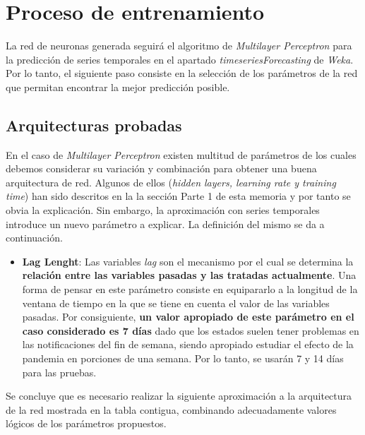 \documentclass[12pt,a4paper, xcolor=table]{article}
\begin{document}
\section{Proceso de entrenamiento}
La red de neuronas generada seguirá el algoritmo de \textit{Multilayer Perceptron }para la predicción de series temporales en el apartado \textit{timeseriesForecasting} de \textit{Weka}. Por lo tanto, el siguiente paso consiste en la selección de los parámetros de la red que permitan encontrar la mejor predicción posible.

    \subsection{Arquitecturas probadas}

    En el caso de \textit{Multilayer Perceptron } existen multitud de parámetros de los cuales debemos considerar su variación y combinación para obtener una buena arquitectura de red. Algunos de ellos (\textit{hidden layers, learning rate y training time}) han sido descritos en la la sección Parte 1 de esta memoria y por tanto se obvia la explicación. Sin embargo, la aproximación con series temporales introduce un nuevo parámetro a explicar. La definición del mismo se da a continuación.

    \begin{itemize}
    \item \textbf{Lag Lenght}: Las variables \textit{lag} son el mecanismo por el cual se determina la \textbf{relación entre las variables pasadas y las tratadas actualmente}. Una forma de pensar en este parámetro consiste en equipararlo a la longitud de la ventana de tiempo en la que se tiene en cuenta el valor de las variables pasadas. Por consiguiente, \textbf{un valor apropiado de este parámetro en el caso considerado es 7 días} dado que los estados suelen tener problemas en las notificaciones del fin de semana, siendo apropiado estudiar el efecto de la pandemia en porciones de una semana. Por lo tanto, se usarán 7 y 14 días para las pruebas.
    \end{itemize}

    Se concluye que es necesario realizar la siguiente aproximación a la arquitectura de la red mostrada en la tabla contigua, combinando adecuadamente valores lógicos de los parámetros propuestos.
\end{document}
